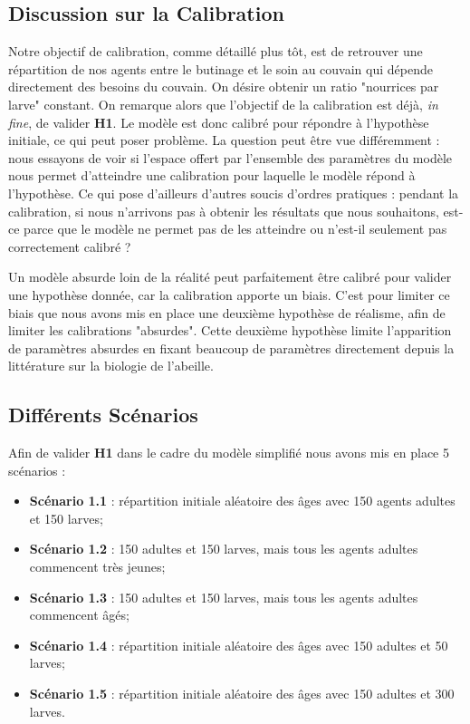 		\subsection{Discussion sur la Calibration}
		
		Notre objectif de calibration, comme détaillé plus tôt, est de retrouver une répartition de nos agents entre le butinage et le soin au couvain qui dépende directement des besoins du couvain. On désire obtenir un ratio "nourrices par larve" constant. On remarque alors que l'objectif de la calibration est déjà, \textit{in fine}, de valider \textbf{H1}. Le modèle est donc calibré pour répondre à l'hypothèse initiale, ce qui peut poser problème. La question peut être vue différemment : nous essayons de voir si l'espace offert par l'ensemble des paramètres du modèle nous permet d'atteindre une calibration pour laquelle le modèle répond à l'hypothèse. Ce qui pose d'ailleurs d'autres soucis d'ordres pratiques : pendant la calibration, si nous n'arrivons pas à obtenir les résultats que nous souhaitons, est-ce parce que le modèle ne permet pas de les atteindre ou n'est-il seulement pas correctement calibré ?
		
		Un modèle absurde loin de la réalité peut parfaitement être calibré pour valider une hypothèse donnée, car la calibration apporte un biais. C'est pour limiter ce biais que nous avons mis en place une deuxième hypothèse de réalisme, afin de limiter les calibrations "absurdes". Cette deuxième hypothèse limite l'apparition de paramètres absurdes en fixant beaucoup de paramètres directement depuis la littérature sur la biologie de l'abeille.
			
	\subsection{Différents Scénarios}
			
			Afin de valider \textbf{H1} dans le cadre du modèle simplifié nous avons mis en place 5 scénarios :
			\begin{itemize}
				\item \textbf{Scénario 1.1} : répartition initiale aléatoire des âges avec 150 agents adultes et 150 larves;
				\item \textbf{Scénario 1.2} : 150 adultes et 150 larves, mais tous les agents adultes commencent très jeunes;
				\item \textbf{Scénario 1.3} : 150 adultes et 150 larves, mais tous les agents adultes commencent âgés;
				\item \textbf{Scénario 1.4} : répartition initiale aléatoire des âges avec 150 adultes et 50 larves;
				\item \textbf{Scénario 1.5} : répartition initiale aléatoire des âges avec 150 adultes et 300 larves.
			\end{itemize}
			
